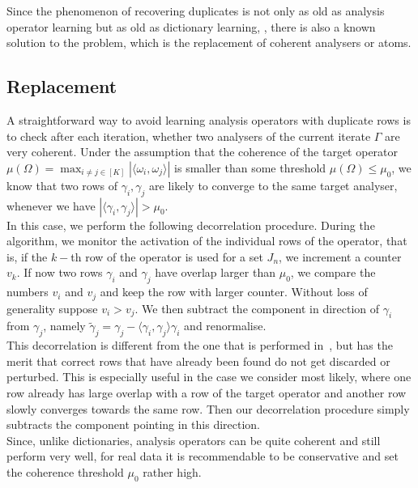 \documentclass[11pt, onecolumn, journal,compsoc]{IEEEtran}
\newcommand\ip[2]{\langle #1, #2\rangle}
\theoremstyle{plain}
\theoremstyle{remark}
\begin{document}
Since the phenomenon of recovering duplicates is not only as old as analysis operator learning but as old as dictionary learning, \cite{ahelbr06}, there is also a known solution to the problem, which is the replacement of coherent analysers or atoms. 
%
%

\subsection{Replacement}\label{sec:ReplacementSimple}
A straightforward way to avoid learning analysis operators with duplicate rows is to check after each iteration, whether two analysers of the current iterate $\Gamma$ are very coherent. Under the assumption that the coherence of the target operator $\mu(\Omega) = \max_{i\neq j\in [K]} |\ip{\omega_i}{\omega_j}|$ is smaller than some threshold $\mu(\Omega)\leq \mu_0$, we know that two rows of $\gamma_i,\gamma_j$ are likely to converge to the same target analyser, whenever we have $|\ip{\gamma_i}{\gamma_j}|> \mu_0$.\\
%
In this case, we perform the following decorrelation procedure. During the algorithm, we monitor the activation of the individual rows of the operator, that is, if the $k-$th row of the operator is used for a set $J_n$, we increment a counter $v_k$. If now two rows $\gamma_i$ and $\gamma_j$ have overlap larger than $\mu_0$, we compare the numbers $v_i$ and $v_j$ and keep the row with larger counter. Without loss of generality suppose $v_i>v_j$. We then subtract the component in direction of $\gamma_i$ from $\gamma_j$, namely $\tilde \gamma_j = \gamma_j - \ip{\gamma_i}{\gamma_j}\gamma_i$ and renormalise.\\
%
This decorrelation is different from the one that is performed in~\cite{dowadaplha16}, but has the merit that correct rows that have already been found do not get discarded or perturbed. This is especially useful in the case we consider most likely, where one row already has large overlap with a row of the target operator and another row slowly converges towards the same row. Then our decorrelation procedure simply subtracts the component pointing in this direction.\\
Since, unlike dictionaries, analysis operators can be quite coherent and still perform very well, for real data it is recommendable to be conservative and set the coherence threshold $\mu_0$ rather high.
\end{document}
